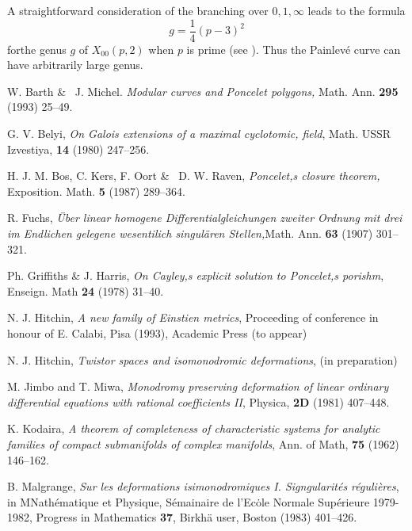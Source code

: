 \begin{remark*}
A straightforward consideration of the branching over $0,1,\infty$ leads to the formula
$$
g = \dfrac{1}{4}(p-3)^{2}
$$
for\pageoriginale the genus $g$ of $X_{00}(p,2)$ when $p$ is prime (see \cite{chap7-key1}). Thus the Painlev\'e curve can have arbitrarily large genus.
\end{remark*}

\begin{thebibliography}{99}
 W. Barth \& \ J. Michel. \textit{Modular curves and Poncelet polygons,} Math. Ann. {\bf 295} (1993) 25--49.

 G. V. Belyi, \textit{On Galois extensions of a maximal cyclotomic, field}, Math. USSR Izvestiya,
{\bf 14} (1980) 247--256.

 H. J. M. Bos, C. Kers, F. Oort \& \ D. W. Raven, \textit{Poncelet,s closure theorem,} Exposition. Math. {\bf 5} (1987) 289--364.

 R. Fuchs, \textit{\"Uber linear homogene Differentialgleichungen zweiter Ordnung mit drei im Endlichen gelegene wesentilich singul\"aren Stellen,}Math. Ann. {\bf 63} (1907) 301--321.

 Ph. Griffiths \& J. Harris, \textit{On Cayley,s explicit solution to Poncelet,s porishm}, Enseign. Math {\bf 24} (1978) 31--40.

 N. J. Hitchin, \textit{A new family of Einstien metrics}, Proceeding of conference in honour of E. Calabi, Pisa (1993), Academic Press (to appear)

 N. J. Hitchin, \textit{Twistor spaces and isomonodromic deformations}, (in preparation)

 M. Jimbo and T. Miwa, \textit{Monodromy preserving deformation of linear ordinary differential equations with rational coefficients II}, Physica, {\bf 2D} (1981) 407--448.

 K. Kodaira, \textit{A theorem of completeness of characteristic systems for analytic families of compact submanifolds of complex manifolds}, Ann. of Math, {\bf 75} (1962) 146--162.
 
 B. Malgrange, \textit{Sur les deformations isimonodromiques I. Signgularit\'es r\'eguli\`eres}, in MNath\'ematique et Physique, S\'emainaire de l'Ec\.{o}le Normale Sup\'erieure 1979-1982, Progress in Mathematics
{\bf 37}, Birkh\"a user, Boston (1983) 401--426.


\end{thebibliography}
